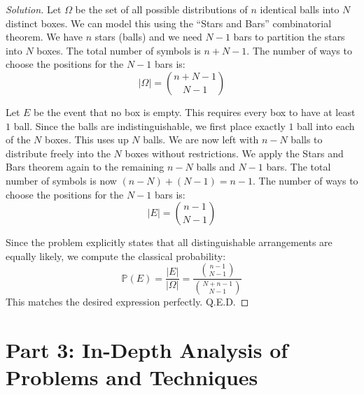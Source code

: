 \documentclass[11pt]{article}
\theoremstyle{definition}
\theoremstyle{remark}
\newcommand{\Prob}{\mathbb{P}}
\begin{document}
\begin{proof}[Solution]
Let $\Omega$ be the set of all possible distributions of $n$ identical balls into $N$ distinct boxes. We can model this using the ``Stars and Bars'' combinatorial theorem. 
We have $n$ stars (balls) and we need $N-1$ bars to partition the stars into $N$ boxes. The total number of symbols is $n + N - 1$. The number of ways to choose the positions for the $N-1$ bars is:
\[ |\Omega| = \binom{n+N-1}{N-1} \]

Let $E$ be the event that no box is empty. This requires every box to have at least $1$ ball.
Since the balls are indistinguishable, we first place exactly $1$ ball into each of the $N$ boxes. This uses up $N$ balls.
We are now left with $n - N$ balls to distribute freely into the $N$ boxes without restrictions.
We apply the Stars and Bars theorem again to the remaining $n - N$ balls and $N-1$ bars. The total number of symbols is now $(n-N) + (N-1) = n - 1$.
The number of ways to choose the positions for the $N-1$ bars is:
\[ |E| = \binom{n-1}{N-1} \]

Since the problem explicitly states that all distinguishable arrangements are equally likely, we compute the classical probability:
\[ \Prob(E) = \frac{|E|}{|\Omega|} = \frac{ \binom{n-1}{N-1} }{ \binom{N+n-1}{N-1} } \]
This matches the desired expression perfectly. Q.E.D.
\end{proof}

\newpage
\section{Part 3: In-Depth Analysis of Problems and Techniques}
\end{document}
